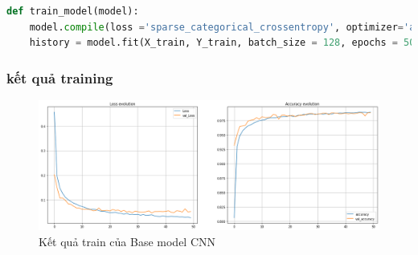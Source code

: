\begin{lstlisting}[language = python]
def train_model(model):
    model.compile(loss ='sparse_categorical_crossentropy', optimizer='adam' ,metrics =['accuracy'])
    history = model.fit(X_train, Y_train, batch_size = 128, epochs = 50, verbose = 1, validation_data = (X_validate, Y_validate))
\end{lstlisting}

\subsubsection{kết quả training}
\begin{center}
    \begin{figure}[!h]
        \centering
        \includegraphics[scale = 0.4]{fileanh/10.png}
        \caption{Kết quả train của Base model CNN}
    \end{figure}
\end{center}

